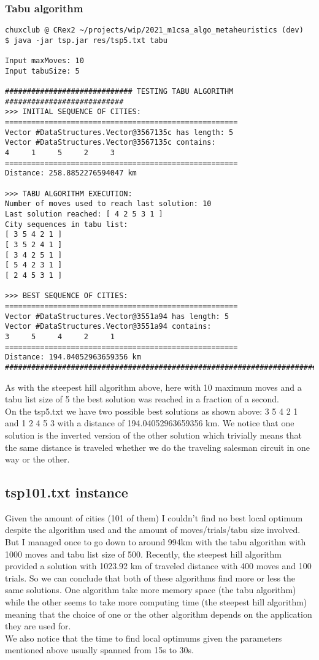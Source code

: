 \documentclass[./standalone.tex]{subfiles}
\begin{document}
\subsubsection{Tabu algorithm}
\begin{lstlisting}[style=Java, caption={Bash output of the execution of the tabu algorithm on the tsp5.txt instance}]
chuxclub @ CRex2 ~/projects/wip/2021_m1csa_algo_metaheuristics (dev)
$ java -jar tsp.jar res/tsp5.txt tabu

Input maxMoves: 10
Input tabuSize: 5

############################# TESTING TABU ALGORITHM ########################### 
>>> INITIAL SEQUENCE OF CITIES: 
===================================================== 
Vector #DataStructures.Vector@3567135c has length: 5
Vector #DataStructures.Vector@3567135c contains: 
4     1     5     2     3 
===================================================== 
Distance: 258.8852276594047 km

>>> TABU ALGORITHM EXECUTION: 
Number of moves used to reach last solution: 10
Last solution reached: [ 4 2 5 3 1 ]
City sequences in tabu list: 
[ 3 5 4 2 1 ]
[ 3 5 2 4 1 ]
[ 3 4 2 5 1 ]
[ 5 4 2 3 1 ]
[ 2 4 5 3 1 ]

>>> BEST SEQUENCE OF CITIES: 
===================================================== 
Vector #DataStructures.Vector@3551a94 has length: 5
Vector #DataStructures.Vector@3551a94 contains: 
3     5     4     2     1 
===================================================== 
Distance: 194.04052963659356 km
################################################################################ 	
\end{lstlisting}
As with the steepest hill algorithm above, here with 10 maximum moves and a tabu list size of 5 the best solution was reached in a fraction of a second.\\

On the tsp5.txt we have two possible best solutions as shown above: 3     5     4     2     1  and  1     2     4     5     3  with a distance of 194.04052963659356 km. We notice that one solution is the inverted version of the other solution which trivially means that the same distance is traveled whether we do the traveling salesman circuit in one way or the other.\\

	\newpage
	\subsection{tsp101.txt instance}
Given the amount of cities (101 of them) I couldn't find no best local optimum despite the algorithm used and the amount of moves/trials/tabu size involved. But I managed once to go down to around 994km with the tabu algorithm with 1000 moves and tabu list size of 500. Recently, the steepest hill algorithm provided a solution with 1023.92 km of traveled distance with 400 moves and 100 trials.  So we can conclude that both of these algorithms find more or less the same solutions. One algorithm take more memory space (the tabu algorithm) while the other seems to take more computing time (the steepest hill algorithm) meaning that the choice of one or the other algorithm depends on the application they are used for.\\

We also notice that the time to find local optimums given the parameters mentioned above usually spanned from 15s to 30s.\\
\end{document}
